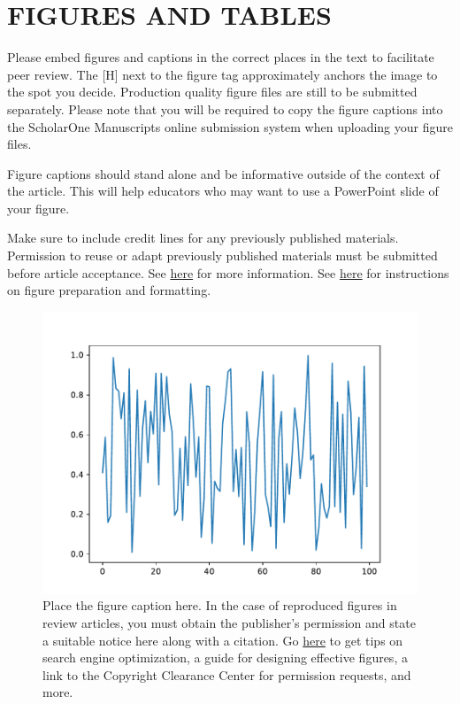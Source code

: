 \documentclass[12pt]{article}
\begin{document}
\section*{\sffamily \Large FIGURES AND TABLES}
Please embed figures and captions in the correct places in the text to facilitate peer review. The [H] next to the figure tag approximately anchors the image to the spot you decide. Production quality figure files are still to be submitted separately. Please note that you will be required to copy the figure captions into the ScholarOne Manuscripts online submission system when uploading your figure files.

Figure captions should stand alone and be informative outside of the context of the article. This will help educators who may want to use a PowerPoint slide of your figure. 

Make sure to include credit lines for any previously published materials. Permission to reuse or adapt previously published materials must be submitted before article acceptance. See \href{http://wires.wiley.com/WileyCDA/Section/id-398153.html#Resources}{here} for more information. See \href{http://media.wiley.com/assets/7315/44/Figure_preparation.pdf}{here} for instructions on figure preparation and formatting.

\begin{figure}[H]
	\centering
	\includegraphics[keepaspectratio=true]{Figure.pdf}
	\caption{Place the figure caption here. In the case of reproduced figures in review articles, you must obtain the publisher's permission and state a suitable notice here along with a citation.  Go \href{http://wires.wiley.com/go/forauthors\#Resources}{here} to get tips on search engine optimization, a guide for designing effective figures, a link to the Copyright Clearance Center for permission requests, and more.}
	\label{fig1} 
\end{figure}
\end{document}
